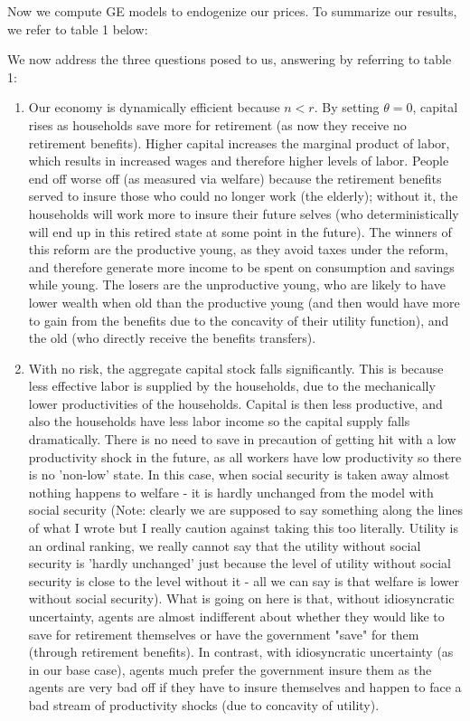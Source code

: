\documentclass[11pt]{article} %
\begin{document}
Now we compute GE models to endogenize our prices. To summarize our results, we refer to table 1 below:

\begin{center}

\end{center}

We now address the three questions posed to us, answering by referring to table 1:
\begin{enumerate}
\item Our economy is dynamically efficient because $n<r$. By setting $\theta = 0$, capital rises as households save more for retirement (as now they receive no retirement benefits). Higher capital increases the marginal product of labor, which results in increased wages and therefore higher levels of labor. People end off worse off (as measured via welfare) because the retirement benefits served to insure those who could no longer work (the elderly); without it, the households will work more to insure their future selves (who deterministically will end up in this retired state at some point in the future). The winners of this reform are the productive young, as they avoid taxes under the reform, and therefore generate more income to be spent on consumption and savings while young. The losers are the unproductive young, who are likely to have lower wealth when old than the productive young (and then would have more to gain from the benefits due to the concavity of their utility function), and the old (who directly receive the benefits transfers).
\item With no risk, the aggregate capital stock falls significantly. This is because less effective labor is supplied by the households, due to the mechanically lower productivities of the households. Capital is then less productive, and also the households have less labor income so the capital supply falls dramatically. There is no need to save in precaution of getting hit with a low productivity shock in the future, as all workers have low productivity so there is no 'non-low' state. In this case, when social security is taken away almost nothing happens to welfare - it is hardly unchanged from the model with social security (Note: clearly we are supposed to say something along the lines of what I wrote but I really caution against taking this too literally. Utility is an ordinal ranking, we really cannot say that the utility without social security is 'hardly unchanged' just because the level of utility without social security is close to the level without it - all we can say is that welfare is lower without social security). What is going on here is that, without idiosyncratic uncertainty, agents are almost indifferent about whether they would like to save for retirement themselves or have the government "save" for them (through retirement benefits). In contrast, with idiosyncratic uncertainty (as in our base case), agents much prefer the government insure them as the agents are very bad off if they have to insure themselves and happen to face a bad stream of productivity shocks (due to concavity of utility). 

\end{enumerate}
\end{document}
